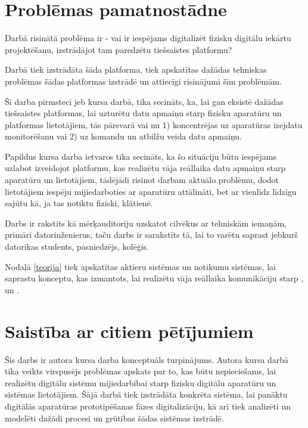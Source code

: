 \section{Problēmas pamatnostādne}

Darbā risinātā problēma ir - vai ir iespējams digitalizēt fizisku digitālu
iekārtu projektēšanu, izstrādājot tam paredzētu tiešsaistes platformu?

Darbā tiek izstrādāta šāda platforma, tiek apskatītas dažādas tehniskas
problēmas šādas platformas izstrādē un attiecīgi risinājumi šīm problēmām. 

Šī darba pirmstecī jeb kursa darbā, tika secināts, ka, lai gan eksistē dažādas
tiešsaistes platformas, lai uzturētu datu apmaiņu starp fizisku aparatūru un
platformas lietotājiem, tās pārsvarā vai nu 1) koncentrējas uz aparatūras
izejdatu monitorēšanu vai 2) uz komandu un atbilžu veida datu apmaiņu.
\cite[para. 3]{VeinbahsKrisjanis2021}

Papildus kursa darba ietvaros tika secināts, ka šo situāciju būtu iespējams
uzlabot izveidojot platformu, kas realizētu vāja reāllaika datu apmaiņu starp
aparatūru un lietotājiem, tādējādi risinot darbam aktuālo problēmu, dodot
lietotājiem iespēju mijiedarboties ar aparatūru attālināti, bet ar vienlīdz
līdzīgu sajūtu kā, ja tas notiktu fiziski, klātienē. \cite[para.
5]{VeinbahsKrisjanis2021} 

Darbs ir rakstīts kā mērķauditoriju uzskatot cilvēkus ar tehniskām iemaņām,
primāri datorinženierus, taču darbs ir sarakstīts tā, lai to varētu saprast
jebkurš datorikas students, pasniedzējs, kolēģis.

Nodaļā \ref{teorija} tiek apskatītas aktieru sistēmas un notikumu sistēmas, lai
saprastu konceptu, kas izmantots, lai realizētu vāja reāllaika komunikāciju
starp ,  un
. 

\section{Saistība ar citiem pētījumiem}

Šis darbs ir autora kursa darba konceptuāls turpinājums. Autora kursa darbā tika veikts virspusējs problēmas
apskats par to, kas būtu nepieciešams, lai realizētu digitālu sistēmu mijiedarbībai starp fizisku digitālu 
aparatūru un sistēmas lietotājiem. Šājā darbā tiek izstrādāta konkrēta sistēma, lai panāktu digitālās aparatūras 
prototipēšanas fāzes digitalizāciju, kā arī tiek analizēti un modelēti dažādi procesi un grūtības šādas sistēmas
izstrādē. \cite{VeinbahsKrisjanis2021}

